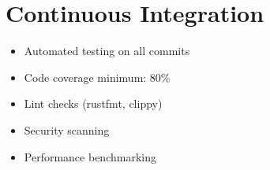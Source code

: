 \documentclass[12pt,a4paper,twoside]{report}
\begin{document}
\section{Continuous Integration}

\begin{itemize}[leftmargin=*]
    \item Automated testing on all commits
    \item Code coverage minimum: 80\%
    \item Lint checks (rustfmt, clippy)
    \item Security scanning
    \item Performance benchmarking
\end{itemize}
\end{document}
